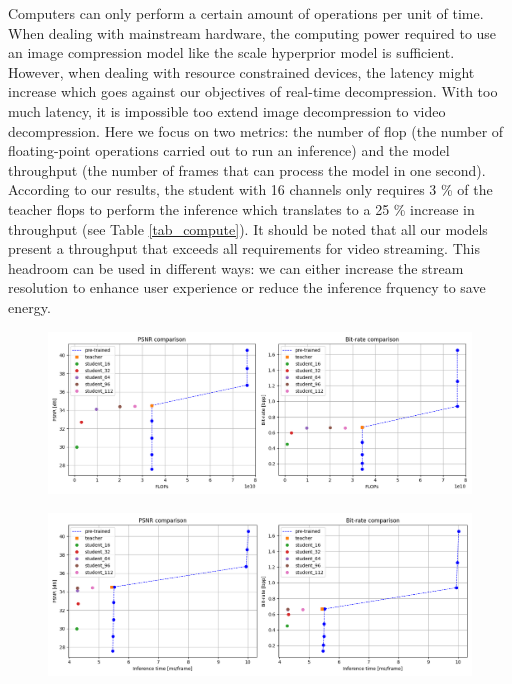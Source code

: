 Computers can only perform a certain amount of operations per unit of time. When dealing with mainstream hardware, the computing power required to use an image compression model like the scale hyperprior model is sufficient. However, when dealing with resource constrained devices, the latency might increase which goes against our objectives of real-time decompression. With too much latency, it is impossible too extend image decompression to video decompression. Here we focus on two metrics: the number of \acrfull{flop} (the number of floating-point operations carried out to run an inference) and the model throughput (the number of frames that can process the model in one second). According to our results, the student with 16 channels only requires 3 \% of the teacher \acrshort{flop}s to perform the inference which translates to a 25 \% increase in throughput (see Table \ref{tab_compute}). It should be noted that all our models present a throughput that exceeds all requirements for video streaming. This headroom can be used in different ways: we can either increase the stream resolution to enhance user experience or reduce the inference frquency to save energy.

\begin{figure}
    \centering
    \includegraphics[width=15cm]{img/kd_lic_flop.png}
    \caption[]{}
    \label{kd_lic_flop}
\end{figure}

\begin{figure}
    \centering
    \includegraphics[width=15cm]{img/kd_lic_time.png}
    \caption[]{}
    \label{kd_lic_time}
\end{figure}

